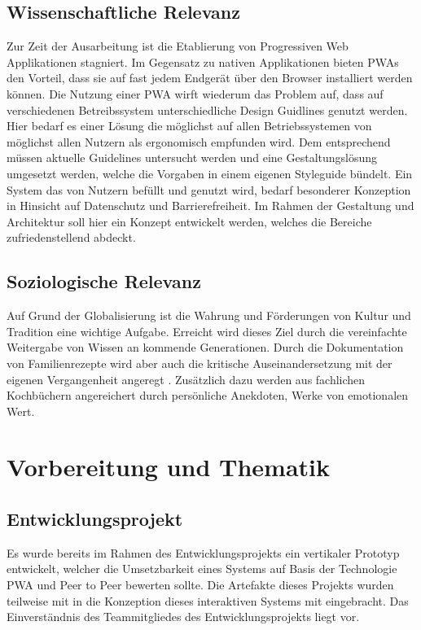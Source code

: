 \subsection{Wissenschaftliche Relevanz}
Zur Zeit der Ausarbeitung ist die Etablierung von Progressiven Web Applikationen stagniert\citep{Magomadov_2020}. Im Gegensatz zu nativen Applikationen bieten PWAs den Vorteil, dass sie auf fast jedem Endgerät über den Browser installiert werden können\citep{MScthesi20:online}. 
Die Nutzung einer PWA wirft wiederum das Problem auf, dass auf verschiedenen Betreibssystem unterschiedliche Design Guidlines genutzt werden\citep{Mitrovic2016ARO}. Hier bedarf es einer Lösung die möglichst auf allen Betriebssystemen von möglichst allen Nutzern als ergonomisch empfunden wird. Dem entsprechend müssen aktuelle Guidelines untersucht werden und eine Gestaltungslösung umgesetzt werden, welche die Vorgaben in einem eigenen Styleguide bündelt.
Ein System das von Nutzern befüllt und genutzt wird, bedarf besonderer Konzeption in Hinsicht auf Datenschutz und Barrierefreiheit\citep{Privacya9:online}. Im Rahmen der Gestaltung und Architektur soll hier ein Konzept entwickelt werden, welches die Bereiche zufriedenstellend abdeckt.

\subsection{Soziologische Relevanz}
Auf Grund der Globalisierung ist die Wahrung und Förderungen von Kultur und Tradition eine wichtige Aufgabe\citep{BryanTurner_2016}. Erreicht wird dieses Ziel durch die vereinfachte Weitergabe von Wissen an kommende Generationen. Durch die Dokumentation von Familienrezepte wird aber auch die kritische Auseinandersetzung mit der eigenen Vergangenheit angeregt \citep{76f9434be2ae4e23b9f44d93097c915c}. Zusätzlich dazu werden aus fachlichen Kochbüchern angereichert durch persönliche Anekdoten, Werke von emotionalen Wert.

\section{Vorbereitung und Thematik}
\subsection{Entwicklungsprojekt}
Es wurde bereits im Rahmen des Entwicklungsprojekts\citep{cobanmai2021} ein vertikaler Prototyp entwickelt, welcher die Umsetzbarkeit eines Systems auf Basis der Technologie PWA und Peer to Peer bewerten sollte. Die Artefakte dieses Projekts wurden teilweise mit in die Konzeption dieses interaktiven Systems mit eingebracht. Das Einverständnis des Teammitgliedes des Entwicklungsprojekts liegt vor.

